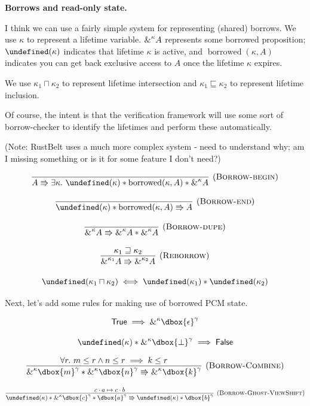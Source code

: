 \documentclass{article}
\newcommand{\einfer}[3]
        {\infer[(\textsc{#1})]{#3}{#2}}
\newcommand\dboxed[1]{\dbox{\vphantom{t}\ensuremath{#1}}}
\newcommand{\viewshift}{\Rrightarrow}
\newcommand{\unit}{\epsilon}
\newcommand{\true}{\textsf{True}}
\newcommand{\false}{\textsf{False}}
\newcommand{\borrow}[2]{\textsc{\&}^{#1}#2}
\newcommand{\ltIntersect}{\sqcap}
\newcommand{\ltLe}{\sqsubseteq}
\newcommand{\ltGe}{\sqsupseteq}
\DeclareMathOperator{\borrowed}{borrowed}
\let\active\undefined
\DeclareMathOperator{\active}{active}
\begin{document}
\textbf{Borrows and read-only state.}

I think we can use a fairly simple system for representing (shared) borrows. 
We use $\kappa$ to represent a lifetime variable.
$\borrow{\kappa}{A}$ represents some borrowed proposition;
$\active(\kappa)$ indicates that lifetime $\kappa$ is active,
and $\borrowed(\kappa, A)$ indicates you can get back exclusive access to $A$
once the lifetime $\kappa$ expires.

We use $\kappa_1 \ltIntersect \kappa_2$ to represent lifetime intersection
and $\kappa_1 \ltLe \kappa_2$ to represent lifetime inclusion.

Of course, the intent is that the verification framework will use some sort of borrow-checker
to identify the lifetimes and perform these automatically.

(Note: RustBelt uses a much more complex system - need to understand why; am I missing something or is it for some feature I don't need?)

\[
  \einfer{Borrow-begin}{
  }{
    A \viewshift \exists
        \kappa .~ \active(\kappa) * \borrowed(\kappa, A) * \borrow{\kappa}{A}
  }
\]

\[
  \einfer{Borrow-end}{
  }{
    \active(\kappa) * \borrowed(\kappa, A) \viewshift A
  }
\]

\[
  \einfer{Borrow-dupe}{
  }{
    \borrow{\kappa}{A} \viewshift \borrow{\kappa}{A} * \borrow{\kappa}{A}
  }
\]

\[
  \einfer{Reborrow}{
    \kappa_1 \ltGe \kappa_2
  }{
    \borrow{\kappa_1}{A} \viewshift \borrow{\kappa_2}{A}
  }
\]

\[
  \active(\kappa_1 \ltIntersect \kappa_2) \iff \active(\kappa_1) * \active(\kappa_2)
\]

Next, let's add some rules for making use of borrowed PCM state.

\[
  \true \implies \borrow{\kappa}{\dboxed{\unit}^\gamma}
\]

\[
  \active(\kappa) * \borrow{\kappa}{\dboxed{\bot}^\gamma} \implies \false
\]

\[
  \einfer{Borrow-Combine}{
    \forall r .~ m \le r \land n \le r \implies k \le r
  }{
    \borrow{\kappa}{\dboxed{m}^\gamma} * \borrow{\kappa}{\dboxed{n}^\gamma} \viewshift \borrow{\kappa}{\dboxed{k}^\gamma}
  }
\]

\[
  \einfer{Borrow-Ghost-ViewShift}{
    c \cdot a \mapsto c \cdot b
  }{
    \active(\kappa) * \borrow{\kappa}{\dboxed{c}^\gamma} * \dboxed{a}^\gamma
    \viewshift
    \active(\kappa) * \dboxed{b}^\gamma
  }
\]
\end{document}
